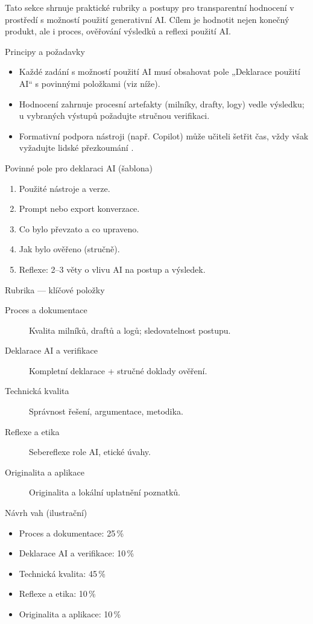 Tato sekce shrnuje praktické rubriky a postupy pro transparentní hodnocení v prostředí s možností použití generativní AI. Cílem je hodnotit nejen konečný produkt, ale i proces, ověřování výsledků a reflexi použití AI.

Principy a požadavky
\begin{itemize}
  \item Každé zadání s možností použití AI musí obsahovat pole „Deklarace použití AI“ s povinnými položkami (viz níže).
  \item Hodnocení zahrnuje procesní artefakty (milníky, drafty, logy) vedle výsledku; u vybraných výstupů požadujte stručnou verifikaci.
  \item Formativní podpora nástroji (např. Copilot) může učiteli šetřit čas, vždy však vyžadujte lidské přezkoumání \cite{kb_ai_101_tipu_pdf_04e4a115_page_21_2}.
\end{itemize}

Povinné pole pro deklaraci AI (šablona)
\begin{enumerate}
  \item Použité nástroje a verze.
  \item Prompt nebo export konverzace.
  \item Co bylo převzato a co upraveno.
  \item Jak bylo ověřeno (stručně).
  \item Reflexe: 2–3 věty o vlivu AI na postup a výsledek.
\end{enumerate}

Rubrika — klíčové položky
\begin{description}
  \item[Proces a dokumentace] Kvalita milníků, draftů a logů; sledovatelnost postupu.
  \item[Deklarace AI a verifikace] Kompletní deklarace + stručné doklady ověření.
  \item[Technická kvalita] Správnost řešení, argumentace, metodika.
  \item[Reflexe a etika] Sebereflexe role AI, etické úvahy.
  \item[Originalita a aplikace] Originalita a lokální uplatnění poznatků.
\end{description}

Návrh vah (ilustrační)
\begin{itemize}
  \item Proces a dokumentace: 25\,\%
  \item Deklarace AI a verifikace: 10\,\%
  \item Technická kvalita: 45\,\%
  \item Reflexe a etika: 10\,\%
  \item Originalita a aplikace: 10\,\%
\end{itemize}

